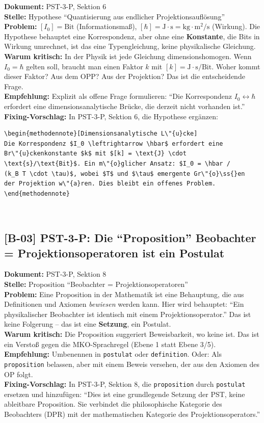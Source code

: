 \documentclass[11pt,a4paper]{article}
\newcommand{\B}[1]{\textbf{[B-#1]}}
\newcommand{\Dok}[1]{\textbf{Dokument:} #1\\}
\newcommand{\Stelle}[1]{\textbf{Stelle:} #1\\}
\newcommand{\Prob}[1]{\textbf{Problem:} #1\\}
\newcommand{\Krit}[1]{\textbf{Warum kritisch:} #1\\}
\newcommand{\Empf}[1]{\textbf{Empfehlung:} #1\\}
\newcommand{\Fix}[1]{\textbf{Fixing-Vorschlag:} #1\\}
\begin{document}
\Dok{PST-3-P, Sektion 6}
\Stelle{Hypothese ``Quantisierung aus endlicher Projektionsaufl\"{o}sung''}
\Prob{$[I_0] = \text{Bit}$ (Informationsma\ss{}), $[\hbar] =
\text{J} \cdot \text{s} = \text{kg} \cdot \text{m}^2/\text{s}$
(Wirkung). Die Hypothese behauptet eine Korrespondenz, aber ohne
eine \textbf{Konstante}, die Bits in Wirkung umrechnet, ist das eine
Typengleichung, keine physikalische Gleichung.}
\Krit{In der Physik ist jede Gleichung dimensionshomogen. Wenn
$I_0 = \hbar$ gelten soll, braucht man einen Faktor $k$ mit
$[k] = \text{J} \cdot \text{s}/\text{Bit}$. Woher kommt dieser
Faktor? Aus dem OPP? Aus der Projektion? Das ist die entscheidende
Frage.}
\Empf{Explizit als offene Frage formulieren: ``Die Korrespondenz
$I_0 \leftrightarrow \hbar$ erfordert eine dimensionsanalytische
Br\"{u}cke, die derzeit nicht vorhanden ist.''}
\Fix{In PST-3-P, Sektion 6, die Hypothese erg\"{a}nzen:
\begin{verbatim}
\begin{methodennote}[Dimensionsanalytische L\"{u}cke]
Die Korrespondenz $I_0 \leftrightarrow \hbar$ erfordert eine
Br\"{u}ckenkonstante $k$ mit $[k] = \text{J} \cdot
\text{s}/\text{Bit}$. Ein m\"{o}glicher Ansatz: $I_0 = \hbar /
(k_B T \cdot \tau)$, wobei $T$ und $\tau$ emergente Gr\"{o}\ss{}en
der Projektion w\"{a}ren. Dies bleibt ein offenes Problem.
\end{methodennote}
\end{verbatim}}

\subsection{\B{03} PST-3-P: Die ``Proposition'' Beobachter =
Projektionsoperatoren ist ein Postulat}

\Dok{PST-3-P, Sektion 8}
\Stelle{Proposition ``Beobachter = Projektionsoperatoren''}
\Prob{Eine Proposition in der Mathematik ist eine Behauptung, die
aus Definitionen und Axiomen \emph{bewiesen} werden kann. Hier wird
behauptet: ``Ein physikalischer Beobachter ist identisch mit einem
Projektionsoperator.'' Das ist keine Folgerung -- das ist eine
\textbf{Setzung}, ein Postulat.}
\Krit{Die Proposition suggeriert Beweisbarkeit, wo keine ist. Das
ist ein Versto\ss{} gegen die MKO-Sprachregel (Ebene 1 statt Ebene
3/5).}
\Empf{Umbenennen in \texttt{postulat} oder \texttt{definition}. Oder:
Als \texttt{proposition} belassen, aber mit einem Beweis versehen,
der aus den Axiomen des OP folgt.}
\Fix{In PST-3-P, Sektion 8, die \texttt{proposition} durch
\texttt{postulat} ersetzen und hinzuf\"{u}gen: ``Dies ist eine
grundlegende Setzung der PST, keine ableitbare Proposition. Sie
verbindet die philosophische Kategorie des Beobachters (DPR) mit
der mathematischen Kategorie des Projektionsoperators.''}
\end{document}
